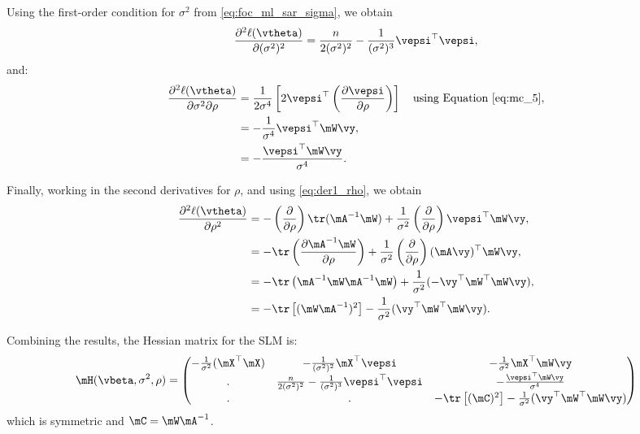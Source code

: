 \documentclass[english,12pt]{book}\usepackage[]{graphicx}\usepackage[]{xcolor}
\begin{document}
Using the first-order condition for $\sigma^2$ from \eqref{eq:foc_ml_sar_sigma}, we obtain
\begin{equation}\label{eq:sar_der_sigma_sigma}
	\frac{\partial^2 \ell(\vtheta)}{\partial (\sigma^2)^2}  = \frac{n}{2(\sigma^2) ^2} - \frac{1}{(\sigma^2)^3} \vepsi^\top \vepsi,
\end{equation}
%
and:
\begin{equation}\label{eq:sar_der_sigma_rho}
\begin{aligned}
\frac{\partial^2 \ell(\vtheta) }{\partial \sigma^2 \partial \rho}  & = \frac{1}{2\sigma ^ 4}\left[2\vepsi^\top \left(\frac{\partial \vepsi}{\partial \rho}\right)\right] \quad \mbox{using Equation \eqref{eq:mc_5}},\\
& =  - \frac{1}{\sigma ^ 4}\vepsi ^\top \mW\vy, \\
& =  -\frac{\vepsi^\top\mW\vy}{\sigma ^ 4}.
\end{aligned}
\end{equation}

Finally, working in the second derivatives for $\rho$, and using \eqref{eq:der1_rho}, we obtain
\begin{equation}\label{eq:sar_der_rho_rho}
\begin{aligned}
\frac{\partial^2 \ell(\vtheta) }{\partial \rho^2}  & = -\left(\frac{\partial }{\partial \rho}\right)\tr(\mA^{-1}\mW) + \frac{1}{\sigma^2}\left(\frac{\partial }{\partial \rho}\right)\vepsi^\top\mW\vy, \\
& = - \tr\left( \frac{\partial \mA^{-1}\mW}{\partial \rho}\right) + \frac{1}{\sigma^2}\left(\frac{\partial }{\partial \rho}\right)(\mA\vy)^\top\mW\vy, \\
& = - \tr\left( \mA^{-1}\mW\mA^{-1}\mW \right)+ \frac{1}{\sigma^2}(- \vy^{\top}\mW^{\top}\mW\vy), \\
& = - \tr\left[(\mW\mA^{-1})^2\right] - \frac{1}{\sigma^2}(\vy^{\top}\mW^{\top}\mW\vy).
\end{aligned}
\end{equation}

Combining the results, the Hessian matrix for the SLM is:
\begin{equation}\label{eq:hessian_sml}
	\mH(\vbeta, \sigma^2, \rho) = 
	\begin{pmatrix}
	- \frac{1}{\sigma^2}(\mX^\top \mX) & - \frac{1}{(\sigma^2)^2} \mX^\top \vepsi & - \frac{1}{\sigma^2} \mX^\top \mW\vy \\
		 .& \frac{n}{2(\sigma^2) ^2} - \frac{1}{(\sigma^2)^3} \vepsi^\top \vepsi & -\frac{\vepsi^\top\mW\vy}{\sigma ^ 4} \\
		 .& . & - \tr\left[(\mC)^2\right] - \frac{1}{\sigma^2}(\vy^{\top}\mW^{\top}\mW\vy)
	\end{pmatrix} 
\end{equation}
%
which is symmetric and $\mC = \mW\mA^{-1}$.
\end{document}
